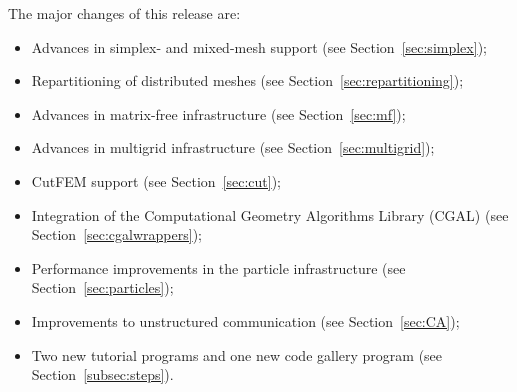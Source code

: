 \documentclass{ansarticle-preprint}
\begin{document}
The major changes of this release are:
%
\begin{itemize}
  \item Advances in simplex- and mixed-mesh support (see Section~\ref{sec:simplex});
  \item Repartitioning of distributed meshes (see Section~\ref{sec:repartitioning});
  \item Advances in matrix-free infrastructure (see Section~\ref{sec:mf});
  \item Advances in multigrid infrastructure (see Section~\ref{sec:multigrid});
  \item CutFEM support (see Section~\ref{sec:cut});
  \item Integration of the Computational Geometry Algorithms Library (CGAL) (see Section~\ref{sec:cgalwrappers});
  \item Performance improvements in the particle infrastructure (see Section~\ref{sec:particles});
  \item Improvements to unstructured communication (see Section~\ref{sec:CA});
  \item Two new tutorial programs and one new code gallery program (see
    Section~\ref{subsec:steps}).
\end{itemize}
%
\end{document}
